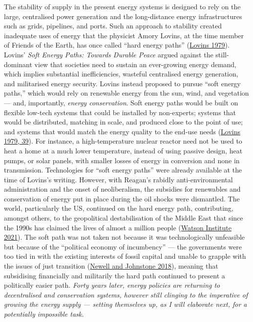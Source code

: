 \documentclass[a4paper, nobind]{templates/ociamthesis}
\begin{document}
The stability of supply in the present energy systems is designed to rely on the large, centralised power generation and the long-distance energy infrastructures such as grids, pipelines, and ports. Such an approach to stability created inadequate uses of energy that the physicist Amory Lovins, at the time member of Friends of the Earth, has once called ``hard energy paths'' (\protect\hyperlink{ref-lovins_soft_1979}{Lovins 1979}). Lovins' \emph{Soft Energy Paths: Towards Durable Peace} argued against the still-dominant view that societies need to sustain an ever-growing energy demand, which implies substantial inefficiencies, wasteful centralised energy generation, and militarised energy security. Lovins instead proposed to pursue ``soft energy paths,'' which would rely on renewable energy from the sun, wind, and vegetation --- and, importantly, \emph{energy conservation}. Soft energy paths would be built on flexible low-tech systems that could be installed by non-experts; systems that would be distributed, matching in scale, and produced close to the point of use; and systems that would match the energy quality to the end-use needs (\protect\hyperlink{ref-lovins_soft_1979}{Lovins 1979, 39}). For instance, a high-temperature nuclear reactor need not be used to heat a home at a much lower temperature, instead of using passive design, heat pumps, or solar panels, with smaller losses of energy in conversion and none in transmission. Technologies for ``soft energy paths'' were already available at the time of Lovins's writing. However, with Reagan's rabidly anti-environmental administration and the onset of neoliberalism, the subsidies for renewables and conservation of energy put in place during the oil shocks were dismantled. The world, particularly the US, continued on the hard energy path, contributing, amongst others, to the geopolitical destabilisation of the Middle East that since the 1990s has claimed the lives of almost a million people (\protect\hyperlink{ref-watson_institute_cost_2021}{Watson Institute 2021}). The soft path was not taken not because it was technologically unfeasible but because of the ``political economy of incumbency'' --- the governments were too tied in with the existing interests of fossil capital and unable to grapple with the issues of just transition (\protect\hyperlink{ref-newell_political_2018}{Newell and Johnstone 2018}), meaning that subsidising financially and militarily the hard path continued to present a politically easier path. \emph{Forty years later, energy policies are returning to decentralised and conservation systems, however still clinging to the imperative of growing the energy supply --- setting themselves up, as I will elaborate next, for a potentially impossible task.}
\end{document}
